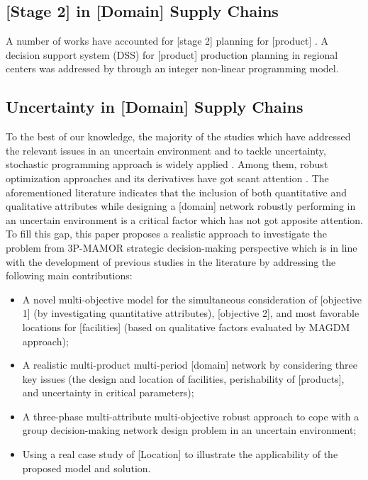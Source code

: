 \documentclass[10pt,twocolumn]{article}
\begin{document}
\subsection{[Stage 2] in [Domain] Supply Chains}

A number of works have accounted for [stage 2] planning for [product]
\cite{Author2010b,Author2007}. A decision support system (DSS) for
[product] production planning in regional centers was addressed by
\citet{Author2010b} through an integer non-linear programming model.

\subsection{Uncertainty in [Domain] Supply Chains}

To the best of our knowledge, the majority of the studies which have
addressed the relevant issues in an uncertain environment and to
tackle uncertainty, stochastic programming approach is widely applied
\cite{Author2014,Author2009,Author2017b}. Among them, robust
optimization approaches and its derivatives have got scant attention
\cite{Author2014b,Author2017c,Author2017d}. The aforementioned
literature indicates that the inclusion of both quantitative and
qualitative attributes while designing a [domain] network robustly
performing in an uncertain environment is a critical factor which has
not got apposite attention. To fill this gap, this paper proposes a
realistic approach to investigate the problem from 3P-MAMOR
strategic decision-making perspective which is in line with the
development of previous studies in the literature by addressing the
following main contributions:

\begin{itemize}
  \item A novel multi-objective model for the simultaneous
        consideration of [objective 1] (by investigating quantitative
        attributes), [objective 2], and most favorable locations for
        [facilities] (based on qualitative factors evaluated by MAGDM
        approach);
  \item A realistic multi-product multi-period [domain] network by
        considering three key issues (the design and location of
        facilities, perishability of [products], and uncertainty in
        critical parameters);
  \item A three-phase multi-attribute multi-objective robust approach
        to cope with a group decision-making network design problem
        in an uncertain environment;
  \item Using a real case study of [Location] to illustrate the
        applicability of the proposed model and solution.
\end{itemize}
\end{document}
